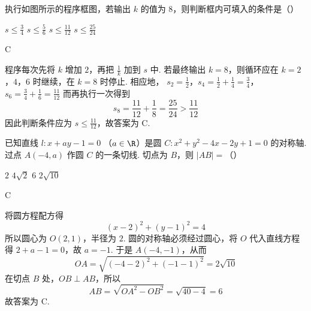 \begin{problem}
执行如图所示的程序框图，若输出 \(k\) 的值为 \(8\)，则判断框内可填入的条件是（\quad）


\choices
    {\(s \leqslant \frac{3}{4}\)}
    {\(s \leqslant \frac{5}{6}\)}
    {\(s \leqslant \frac{11}{12}\)}
    {\(s \leqslant \frac{25}{24}\)}

\begin{answer}
C
\end{answer}

\begin{solution}
程序每次先将 \(k\) 增加 \(2\)，再把 \(\frac1k\) 加到 \(s\) 中. 若最终输出 \(k=8\)，则循环应在 \(k=2\)，\(4\)，\(6\) 时继续，在 \(k=8\) 时停止. 相应地，
\(s_2=\frac12\)，\(s_4=\frac12+\frac14=\frac34\)，\(s_6=\frac34+\frac16=\frac{11}{12}\)
而再执行一次得到
\[
s_8=\frac{11}{12}+\frac18=\frac{25}{24}>\frac{11}{12}
\]
因此判断条件应为 \(s\leqslant\frac{11}{12}\)，故答案为 C.
\end{solution}
\end{problem}

\begin{problem}
已知直线 \(l: x + ay - 1 = 0 \) （\(a \in \R\)）是圆 \(C: x^2 + y^2 - 4x - 2y + 1 = 0\) 的对称轴. 过点 \(A(-4, a)\) 作圆 \(C\) 的一条切线. 切点为 \(B\)，则 \(|AB| =\)（\quad）

\choices
    {\(2\)}
    {\(4\sqrt{2}\)}
    {\(6\)}
    {\(2\sqrt{10}\)}

\begin{answer}
C
\end{answer}

\begin{solution}
将圆方程配方得
\[
(x-2)^2+(y-1)^2=4
\]
所以圆心为 \(O(2,1)\)，半径为 \(2\). 圆的对称轴必须经过圆心，将 \(O\) 代入直线方程得 \(2+a-1=0\)，故 \(a=-1\). 于是 \(A(-4,-1)\)，从而
\[
OA=\sqrt{(-4-2)^2+(-1-1)^2}=2\sqrt{10}
\]
在切点 \(B\) 处，\(OB\perp AB\)，所以
\[
AB=\sqrt{OA^2-OB^2}=\sqrt{40-4}=6
\]
故答案为 C.
\end{solution}
\end{problem}

